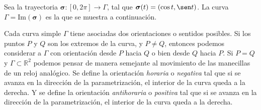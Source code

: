 \begin{example}
    Sea la trayectoria $\boldsymbol{\sigma}:[0,2\pi]\to\Gamma$, tal que $\boldsymbol{\sigma}(t)=(\cos t, \sen t)$. La curva $\Gamma=\text{Im}(\boldsymbol{\sigma})$ es la que se muestra a continuaci\'on.

    \begin{center}
    \end{center}
    
\end{example}



 \begin{obs}
    Cada curva simple $\Gamma$ tiene asociadas dos orientaciones o sentidos posibles. Si los puntos $P$ y $Q$ son los extremos de la curva, y $P\neq Q$, entonces podemos considerar a $\Gamma$ con orientaci\'on desde $P$ hacia $Q$ o bien desde $Q$ hacia $P$.   Si $P=Q$ y $\Gamma \subset \mathbb{R}^{2}$ podemos pensar de manera semejante al movimiento de las manecillas de un reloj anal\'ogico.  Se define la orientaci\'on \emph{horaria} o \emph{negativa} tal que si se avanza en la dirección de la parametrización, el interior de la curva queda a la derecha.  Y se define la orientaci\'on \emph{antihoraria} o \emph{positiva} tal que si se avanza en la dirección de la parametrización, el interior de la curva queda a la derecha.
 \end{obs}

